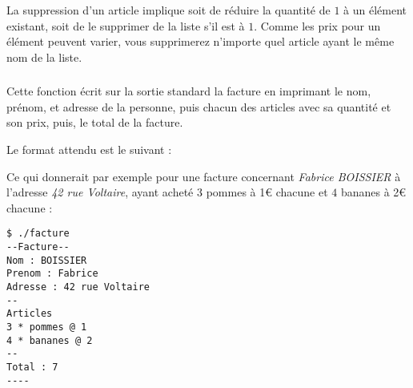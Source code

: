 \noindent La suppression d'un article implique soit de réduire la quantité de $ 1 $ à un élément existant, soit de le supprimer de la liste s'il est à $ 1 $.
Comme les prix pour un élément peuvent varier, vous supprimerez n'importe quel article ayant le même nom de la liste.


\bigskip

\subsubsection*{}

\noindent Cette fonction écrit sur la sortie standard la facture en imprimant le nom, prénom, et adresse de la personne, puis chacun des articles avec sa quantité et son prix, puis, le total de la facture.

\bigskip

\noindent Le format attendu est le suivant :

\bigskip

\noindent {}

\noindent {}

\noindent {}

\noindent {}

\noindent {}

\noindent {}

\noindent {}

\noindent {}

\noindent {}

\noindent {}


\bigskip

\noindent Ce qui donnerait par exemple pour une facture concernant \textit{Fabrice BOISSIER} à l'adresse \textit{42 rue Voltaire}, ayant acheté $ 3 $ pommes à 1€ chacune et $ 4 $ bananes à 2€ chacune :

\bigskip

\lstset{language=sh}
\begin{lstlisting}[frame=single,title={Exemple}]
$ ./facture
--Facture--
Nom : BOISSIER
Prenom : Fabrice
Adresse : 42 rue Voltaire
--
Articles
3 * pommes @ 1
4 * bananes @ 2
--
Total : 7
----
\end{lstlisting}
